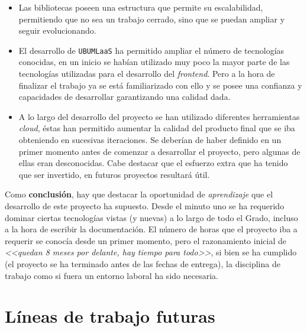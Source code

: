 \begin{itemize}
\item Las bibliotecas poseen una estructura que permite su escalabilidad, permitiendo que no sea un trabajo cerrado, sino que se puedan ampliar y seguir evolucionando.
\item El desarrollo de \texttt{UBUMLaaS} ha permitido ampliar el número de tecnologías conocidas, en un inicio se habían utilizado muy poco la mayor parte de las tecnologías utilizadas para el desarrollo del \textit{frontend}. Pero a la hora de finalizar el trabajo ya se está familiarizado con ello y se posee una confianza y capacidades de desarrollar garantizando una calidad dada.
\item A lo largo del desarrollo del proyecto se han utilizado diferentes herramientas \emph{cloud}, éstas han permitido aumentar la calidad del producto final que se iba obteniendo en sucesivas iteraciones. Se deberían de haber definido en un primer momento antes de comenzar a desarrollar el proyecto, pero algunas de ellas eran desconocidas. Cabe destacar que el esfuerzo extra que ha tenido que ser invertido, en futuros proyectos resultará útil.
\end{itemize}

Como \textbf{conclusión}, hay que destacar la oportunidad de \emph{aprendizaje} que el desarrollo de este proyecto ha supuesto. Desde el minuto uno se ha requerido dominar ciertas tecnologías vistas (y nuevas) a lo largo de todo el Grado, incluso a la hora de escribir la documentación. El número de horas que el proyecto iba a requerir se conocía desde un primer momento, pero el razonamiento inicial de \emph{<<quedan 8 meses por delante, hay tiempo para todo>>}, si bien se ha cumplido (el proyecto se ha terminado antes de las fechas de entrega), la disciplina de trabajo como si fuera un entorno laboral ha sido necesaria.

\section{Líneas de trabajo futuras}

